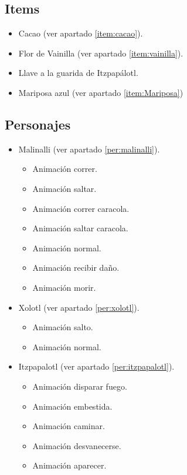 \begin{itemize}
        \subsection{Items}
                \begin{itemize}
                        \item   Cacao (ver apartado \ref{item:cacao}).
                        \item Flor de Vainilla (ver apartado \ref{item:vainilla}).
                        \item Llave a la guarida de Itzpapálotl.
                        \item Mariposa azul (ver apartado \ref{item:Mariposa})
                \end{itemize}
        \subsection{Personajes}
        \begin{itemize}
                \item Malinalli (ver apartado \ref{per:malinalli}).
                \begin{itemize}
                        \item Animación correr.
                        \item Animación saltar.
                        \item Animación correr caracola.
                        \item Animación saltar caracola.
                        \item Animación normal.
                        \item Animación recibir daño.
						\item Animación morir.
                \end{itemize}
                \item Xolotl (ver apartado \ref{per:xolotl}).
                	\begin{itemize}
						\item Animación salto.
						\item Animación normal.
					\end{itemize}
                \item Itzpapalotl (ver apartado \ref{per:itzpapalotl}).
                \begin{itemize}
                        \item Animación disparar fuego.
                        \item Animación embestida.
                        \item Animación caminar.
                        \item Animación desvanecerse.
                        \item Animación aparecer.
                \end{itemize}
        \end{itemize}

\end{itemize}
